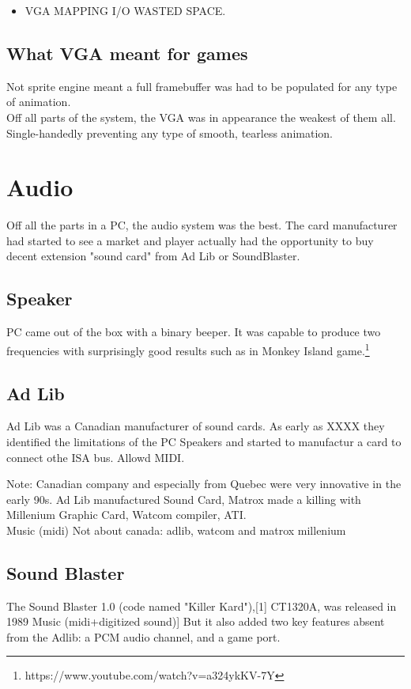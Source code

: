 \documentclass[book.tex]{subfiles}
\begin{document}
\begin{itemize}
\item VGA MAPPING I/O WASTED SPACE.

\end{itemize}

\subsection{What VGA meant for games}
Not sprite engine meant a full framebuffer was had to be populated for any type of animation.\\
Off all parts of the system, the VGA was in appearance the weakest of them all. Single-handedly preventing any type of smooth, tearless animation.




  

\section{Audio}
Off all the parts in a PC, the audio system was the best. The card manufacturer had started to see a market and player actually had the opportunity to buy decent extension "sound card" from Ad Lib or SoundBlaster.
  \subsection{Speaker}
  PC came out of the box with a binary beeper. It was capable to produce two frequencies with surprisingly good results such as in Monkey Island game.\footnote{https://www.youtube.com/watch?v=a324ykKV-7Y}
  \subsection{Ad Lib}
  Ad Lib was a Canadian manufacturer of sound cards. As early as XXXX they identified the limitations of the PC Speakers and started to manufactur a card to connect othe ISA bus. Allowd MIDI.
  
  Note: Canadian company and especially from Quebec were very innovative in the early 90s. Ad Lib manufactured Sound Card, Matrox made a killing with Millenium Graphic Card, Watcom compiler, ATI.\\
  
  Music (midi)
  Not about canada: adlib, watcom and matrox millenium
  \subsection{Sound Blaster}
  The Sound Blaster 1.0 (code named "Killer Kard"),[1] CT1320A, was released in 1989
  Music (midi+digitized sound)]  But it also added two key features absent from the Adlib: a PCM audio channel, and a game port.
\end{document}
